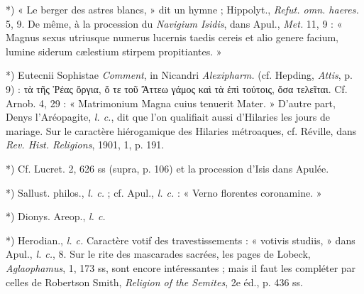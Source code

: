 \documentclass[a4paper, 11pt, oneside, polutonikogreek, french]{article}
\begin{document}
*) « Le berger des astres blancs, » dit un hymne ; Hippolyt., \emph{Refut. omn. haeres.} 5, 9. De même, à la procession du \emph{Navigium Isidis}, dans Apul., \emph{Met.} 11, 9 : « Magnus sexus utriusque numerus lucernis taedis cereis et alio genere facium, lumine siderum cælestium stirpem propitiantes. »

*) Eutecnii Sophistae \emph{Comment}, in Nicandri \emph{Alexipharm.} (cf. Hepding, \emph{Attis}, p. 9) : τὰ τῆς Ῥέας ὄργια, ὅ τε τοῦ Ἄττεω γάμος καὶ τὰ ἐπὶ τούτοις, ὅσα τελεῖται. Cf. Arnob. 4, 29 : « Matrimonium Magna cuius tenuerit Mater. » D'autre part, Denys l'Aréopagite, \emph{l. c.}, dit que l'on qualifiait aussi d'Hilaries les jours de mariage. Sur le caractère hiérogamique des Hilaries métroaques, cf. Réville, dans \emph{Rev. Hist. Religions}, 1901, 1, p. 191.

*) Cf. Lucret. 2, 626 ss (supra, p. 106) et la procession d'Isis dans Apulée.

*) Sallust. philos., \emph{l. c.} ; cf. Apul., \emph{l. c.} : « Verno florentes coronamine. »

*) Dionys. Areop., \emph{l. c.}

*) Herodian., \emph{l. c.} Caractère votif des travestissements : « votivis studiis, » dans Apul., \emph{l. c.}, 8. Sur le rite des mascarades sacrées, les pages de Lobeck, \emph{Aglaophamus}, 1, 173 ss, sont encore intéressantes ; mais il faut les compléter par celles de Robertson Smith, \emph{Religion of the Semites}, 2e éd., p. 436 ss.
\end{document}
